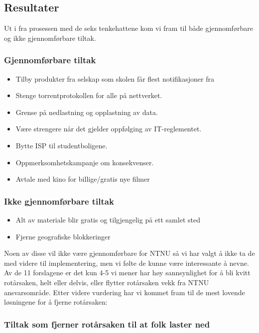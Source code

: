 \subsection{Resultater}
Ut i fra prosessen med de seks tenkehattene kom vi fram til både gjennomførbare og ikke gjennomførbare tiltak. 
\subsubsection{Gjennomførbare tiltak}
\begin{itemize}
    \item Tilby produkter fra selskap som skolen får flest notifikasjoner fra
    \item Stenge torrentprotokollen for alle på nettverket.
    \item Grense på nedlastning og opplastning av data.
    \item Være strengere når det gjelder oppfølging av IT-reglementet. 
    \item Bytte ISP til studentboligene.
    \item Oppmerksomhetskampanje om konsekvenser.
    \item Avtale med kino for billige/gratis nye filmer
\end{itemize}

\subsubsection{Ikke gjennomførbare tiltak}
\begin{itemize}
    \item Alt av materiale blir gratis og tilgjengelig på ett samlet sted
    \item Fjerne geografiske blokkeringer
\end{itemize}

Noen av disse vil ikke være gjennomførbare for NTNU så vi har valgt å ikke ta de med videre til implementering, men vi følte de kunne være interessante å nevne. Av de 11 forslagene er det kun 4-5 vi mener har høy sannsynlighet for å bli kvitt rotårsaken, helt eller delvis, eller flytter rotårsaken vekk fra NTNU ansvarsområde. Etter videre vurdering har vi kommet fram til de mest lovende løsningene for å fjerne rotårsaken: 

\subsubsection*{Tiltak som fjerner rotårsaken til at folk laster ned}


